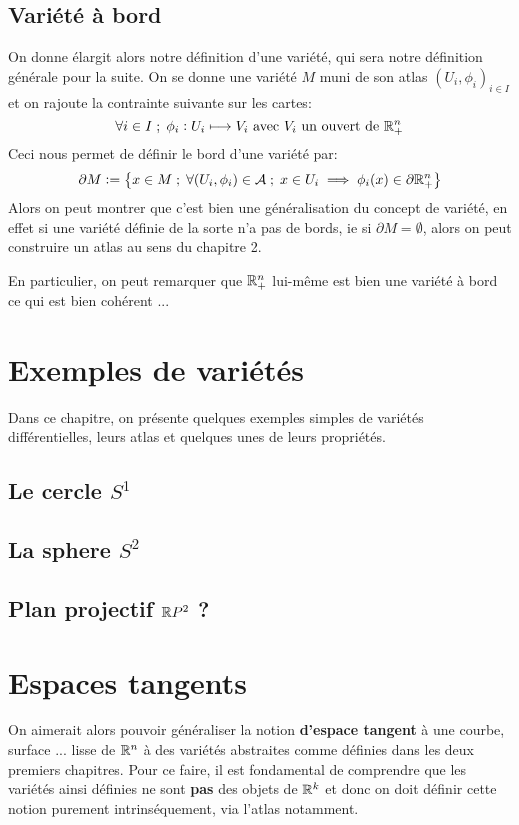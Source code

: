    \section{Variété à bord}
   On donne élargit alors notre définition d'une variété, qui sera notre définition générale pour la suite. On se donne une variété \( M \) muni de son atlas \( (U_i, \phi_i)_{i \in I} \) et on rajoute la contrainte suivante sur les cartes:
   \[ 
      \forall i \in I \; ; \; \phi_i : U_i \longmapsto V_i \text{ avec } V_i \text{ un ouvert de } \mathbb{R}^n_+
   \]
   Ceci nous permet de définir le bord d'une variété par:
   \[ 
      \partial M := \left\{ x \in M  \; ; \; \forall (U_i, \phi_i) \in \mathcal{A} \; ; \; x \in U_i \implies \phi_i(x) \in \partial\mathbb{R}^n_+\right\}  
   \]
   Alors on peut montrer que c'est bien une généralisation du concept de variété, en effet si une variété définie de la sorte n'a pas de bords, ie si \( \partial M = \emptyset\), alors on peut construire un atlas au sens du chapitre 2.\<

   En particulier, on peut remarquer que \( \mathbb{R}^n_+ \) lui-même est bien une variété à bord ce qui est bien cohérent ...
\chapter{Exemples de variétés}
   Dans ce chapitre, on présente quelques exemples simples de variétés différentielles, leurs atlas et quelques unes de leurs propriétés.
   \section{Le cercle \( S^1 \)}
   \section{La sphere \( S^2 \)}
   \section{Plan projectif \( \mathbb{R} P^2 \) ?}
\chapter{Espaces tangents}
On aimerait alors pouvoir généraliser la notion \textbf{d'espace tangent} à une courbe, surface ... lisse de \( \mathbb{R}^n \) à des variétés abstraites comme définies dans les deux premiers chapitres. Pour ce faire, il est fondamental de comprendre que les variétés ainsi définies ne sont \textbf{pas} des objets de \( \mathbb{R}^k \) et donc on doit définir cette notion purement intrinséquement, via l'atlas notamment.

